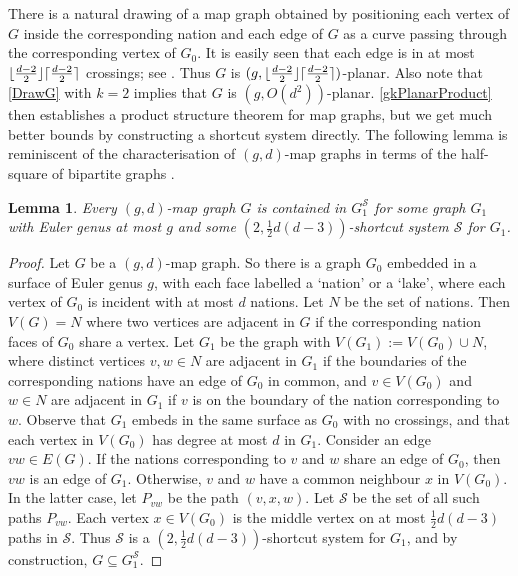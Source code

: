 \documentclass{patmorin}
\theoremstyle{plain}
\newtheorem{lem}[thm]{Lemma}
\theoremstyle{definition}
\DeclarePairedDelimiter{\ceil}{\lceil}{\rceil}
\DeclarePairedDelimiter{\floor}{\lfloor}{\rfloor}
\renewcommand{\SS}{\mathcal{S}}
\begin{document}
There is a natural drawing of a map graph obtained by positioning each vertex of $G$ inside the corresponding nation and each edge of $G$ as a curve passing through the corresponding vertex of $G_0$. It is easily seen that each edge is in at most $\floor{\frac{d-2}{2}}\ceil{\frac{d-2}{2}}$ crossings; see \citep{dujmovic.eppstein.ea:structure}. Thus $G$ is $(g,\floor{\frac{d-2}{2}}\ceil{\frac{d-2}{2}})$-planar. Also note that \cref{DrawG} with $k=2$ implies that $G$ is $(g, O(d^{2}) )$-planar. \cref{gkPlanarProduct} then establishes a product structure theorem for map graphs, but we get much better bounds by constructing a shortcut system directly.  The following lemma is reminiscent of the characterisation of $(g,d)$-map graphs in terms of the half-square of bipartite graphs \citep{CGP02,dujmovic.eppstein.ea:structure}.

\begin{lem}
\label{MapShortcut}
Every $(g,d)$-map graph $G$ is contained in $G_1^\SS$ for some graph $G_1$ with Euler genus at most $g$ and some $(2,\tfrac12 d(d-3) )$-shortcut system $\SS$ for $G_1$.
\end{lem}

\begin{proof}
Let $G$ be a $(g,d)$-map graph. So there is a graph $G_0$ embedded in a surface of Euler genus $g$, with each face labelled a `nation' or a `lake', where each vertex of $G_0$ is incident with at most $d$ nations. Let $N$ be the set of nations. Then $V(G)=N$ where two vertices are adjacent in $G$ if the corresponding nation faces of $G_0$ share a vertex. Let $G_1$ be the graph with $V(G_1):=V(G_0) \cup N$, where distinct vertices $v,w\in N$ are adjacent in $G_1$ if the boundaries of the corresponding nations have an edge of $G_0$ in common, and $v\in V(G_0)$ and $w\in N$ are adjacent in $G_1$ if $v$ is on the boundary of the nation corresponding to $w$. Observe that $G_1$ embeds in the same surface as $G_0$ with no crossings, and that each vertex in $V(G_0)$ has degree at most $d$ in $G_1$. Consider an edge $vw\in E(G)$. If the nations corresponding to $v$ and $w$ share an edge of $G_0$, then $vw$ is an edge of $G_1$. Otherwise,  $v$ and $w$ have a common neighbour $x$ in $V(G_0)$. In the latter case, let $P_{vw}$ be the path $(v,x,w)$. Let $\SS$ be the set of all such paths $P_{vw}$. Each vertex $x\in V(G_0)$ is the middle vertex on at most $\tfrac12 d(d-3)$  paths in $\SS$. Thus $\SS$ is a $(2,\tfrac12 d(d-3))$-shortcut system for $G_1$, and by construction, $G \subseteq G_1^\SS$.
\end{proof}
\end{document}

